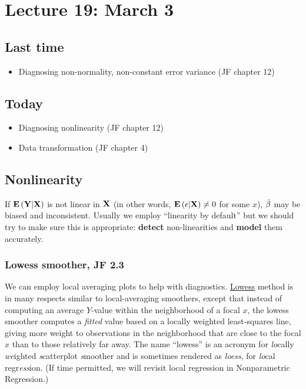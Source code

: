 \setcounter{section}{18}


\section{Lecture 19: March 3}


\subsection*{Last time}
\begin{itemize}
  \item Diagnosing non-normality, non-constant error variance (JF chapter 12)
\end{itemize}


\subsection*{Today}
\begin{itemize}
\item Diagnosing nonlinearity (JF chapter 12)
\item Data transformation (JF chapter 4)
\end{itemize}

\subsection*{Nonlinearity}

If ${\mathbf{E}\left(\mathbf{Y}|\mathbf{X}\right)}$ is not linear in $\mathbf{X}$ (in other words, ${\mathbf{E}\left(\mathbf{\epsilon} | \mathbf{X}\right)} \ne 0$ for some $x$), $\hat{\mathbf{\beta}}$ may be biased and inconsistent.
Usually we employ ``linearity by default'' but we should try to make sure this is appropriate: {\bf detect} non-linearities and {\bf model} them accurately.

\subsubsection*{Lowess smoother, JF 2.3}
We can employ local averaging plots to help with diagnostics.
\underline{Lowess} method is in many respects similar to local-averaging smoothers, except that instead of computing an average $Y$-value within the neighborhood of a focal $x$,
the lowess smoother computes a {\it fitted} value based on a locally weighted least-squares line, giving more weight to observations in the neighborhood that are close to the focal $x$ than
to those relatively far away.
The name ``lowess'' is an acronym for {\it lo}cally {\it we}ighted {\it s}catterplot {\it s}moother and is sometimes rendered as {\it loess}, for {\it lo}cal regr{\it ess}ion. 
 (If time permitted, we will revisit local regression in Nonparametric Regression.)

